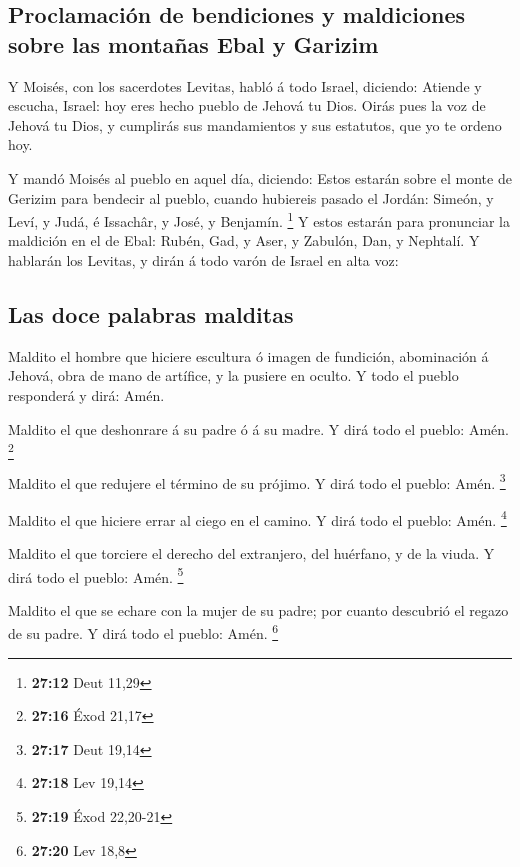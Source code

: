 \hypertarget{proclamaciuxf3n-de-bendiciones-y-maldiciones-sobre-las-montauxf1as-ebal-y-garizim}{%
\subsection{Proclamación de bendiciones y maldiciones sobre las montañas
Ebal y
Garizim}\label{proclamaciuxf3n-de-bendiciones-y-maldiciones-sobre-las-montauxf1as-ebal-y-garizim}}

 Y Moisés, con los sacerdotes Levitas, habló á todo
Israel, diciendo: Atiende y escucha, Israel: hoy eres hecho pueblo de
Jehová tu Dios.  Oirás pues la voz de Jehová tu Dios, y
cumplirás sus mandamientos y sus estatutos, que yo te ordeno hoy.

 Y mandó Moisés al pueblo en aquel día, diciendo:
 Estos estarán sobre el monte de Gerizim para bendecir al
pueblo, cuando hubiereis pasado el Jordán: Simeón, y Leví, y Judá, é
Issachâr, y José, y Benjamín. \footnote{\textbf{27:12} Deut 11,29}
 Y estos estarán para pronunciar la maldición en el de
Ebal: Rubén, Gad, y Aser, y Zabulón, Dan, y Nephtalí.  Y
hablarán los Levitas, y dirán á todo varón de Israel en alta voz:

\hypertarget{las-doce-palabras-malditas}{%
\subsection{Las doce palabras
malditas}\label{las-doce-palabras-malditas}}

 Maldito el hombre que hiciere escultura ó imagen de
fundición, abominación á Jehová, obra de mano de artífice, y la pusiere
en oculto. Y todo el pueblo responderá y dirá: Amén.

 Maldito el que deshonrare á su padre ó á su madre. Y
dirá todo el pueblo: Amén. \footnote{\textbf{27:16} Éxod 21,17}

 Maldito el que redujere el término de su prójimo. Y dirá
todo el pueblo: Amén. \footnote{\textbf{27:17} Deut 19,14}

 Maldito el que hiciere errar al ciego en el camino. Y
dirá todo el pueblo: Amén. \footnote{\textbf{27:18} Lev 19,14}

 Maldito el que torciere el derecho del extranjero, del
huérfano, y de la viuda. Y dirá todo el pueblo: Amén. \footnote{\textbf{27:19}
  Éxod 22,20-21}

 Maldito el que se echare con la mujer de su padre; por
cuanto descubrió el regazo de su padre. Y dirá todo el pueblo: Amén.
\footnote{\textbf{27:20} Lev 18,8}

